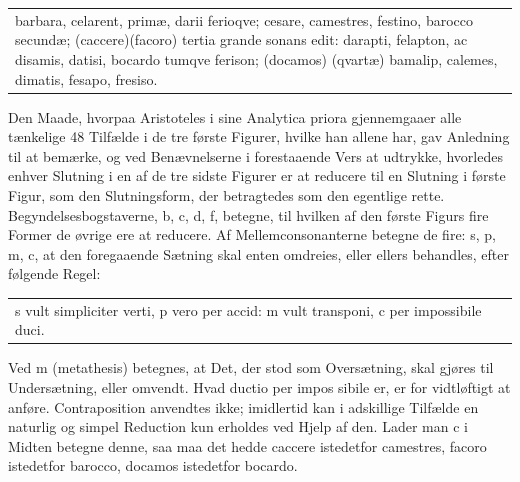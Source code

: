 \documentclass[12pt]{book}
\def\textit#1{#1}%
\def\\{ }%
\newcommand{\opage}[1]{\marginnote{\footnotesize\textit{[#1]}}}
\begin{document}
\begin{center}
\begin{tabular}{@{}l@{}}
\textit{barbara, celarent, primæ, darii ferioqve;}\\
\textit{cesare, camestres, festino, barocco secundæ;}\\
\hspace*{3.6em}\textit{(caccere)}\hspace*{4.6em}\textit{(facoro)}\\
\textit{tertia grande sonans edit: darapti, felapton,}\\
\textit{ac disamis, datisi, bocardo tumqve ferison;}\\
\hspace*{7.4em}\textit{(docamos)}\\
\textit{(qvartæ) bamalip, calemes, dimatis, fesapo,}\\
\hspace*{14.2em}\textit{fresiso.}
\end{tabular}
\end{center}
Den Maade, hvorpaa Aristoteles i sine \textit{Analytica priora} gjennemgaaer
alle tænkelige 48 Tilfælde i de tre første Figurer, hvilke han allene har, gav
Anledning til at bemærke, og ved Benævnelserne i forestaaende Vers at udtrykke,
hvorledes enhver Slutning i en af de tre sidste Figurer er at reducere til en
Slutning i første Figur, som den Slutningsform, der betragtedes som den
egentlige rette. Begyndelsesbogstaverne, \textit{b}, \textit{c}, \textit{d},
\textit{f}, betegne, til hvilken af den første Figurs fire Former de øvrige ere
at reducere. Af Mellemconsonanterne betegne de fire: \textit{s}, \textit{p},
\textit{m}, \textit{c}, at den foregaaende Sætning skal enten omdreies, eller
ellers behandles, efter følgende Regel:
\begin{center}
\begin{tabular}{@{}l@{}}
\textit{s vult simpliciter verti, p vero per accid:}\\
\hspace*{1.1em}\textit{m vult transponi, c per impossibile duci.}
\end{tabular}
\end{center}
Ved \textit{m} (\textit{metathesis}) betegnes, at Det, der stod som
Oversætning, skal gjøres til Undersætning, eller omvendt. Hvad \textit{ductio
per impos%
\opage{341}sibile} er, er for vidtløftigt at anføre. Contraposition anvendtes ikke;
imidlertid kan i adskillige Tilfælde en naturlig og simpel Reduction kun
erholdes ved Hjelp af den. Lader man \textit{c} i Midten betegne denne, saa maa
det hedde \textit{caccere} istedetfor \textit{camestres}, \textit{facoro}
istedetfor \textit{barocco}, \textit{docamos} istedetfor \textit{bocardo}.
\end{document}
